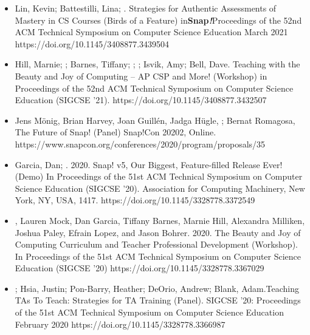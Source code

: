 \begin{itemize}
    \item{Lin, Kevin; Battestilli, Lina; \me. Strategies for Authentic Assessments of Mastery in CS Courses (Birds of a Feature) in\textbf{Snap\textit{!}}Proceedings of the 52nd ACM Technical Symposium on Computer Science Education March 2021
    \newline
    https://doi.org/10.1145/3408877.3439504}
    
    \item{Hill, Marnie; \dan; Barnes, Tiffany; \lauren; \me; Isvik, Amy; Bell, Dave. Teaching with the Beauty and Joy of Computing – AP CSP and More! (Workshop) in Proceedings of the 52nd ACM Technical Symposium on Computer Science Education (SIGCSE '21).
    \newline
    https://doi.org/10.1145/3408877.3432507}
    
    \item{Jens Mönig, Brian Harvey, Joan Guillén, Jadga Hügle, \me; Bernat Romagosa, The Future of Snap! (Panel) Snap!Con 20202, Online.
    \newline
    https://www.snapcon.org/conferences/2020/program/proposals/35
    }
    
    \item{Garcia, Dan; \me. 2020. Snap! v5, Our Biggest, Feature-filled Release Ever! (Demo) In Proceedings of the 51st ACM Technical Symposium on Computer Science Education (SIGCSE '20). Association for Computing Machinery, New York, NY, USA, 1417. https://doi.org/10.1145/3328778.3372549}
    
    \item{\me, Lauren Mock, Dan Garcia, Tiffany Barnes, Marnie Hill, Alexandra Milliken, Joshua Paley, Efrain Lopez, and Jason Bohrer. 2020. The Beauty and Joy of Computing Curriculum and Teacher Professional Development (Workshop). In Proceedings of the 51st ACM Technical Symposium on Computer Science Education (SIGCSE '20)
    \newline
    https://doi.org/10.1145/3328778.3367029}
    
    \item{\me; Hsia, Justin; Pon-Barry, Heather; DeOrio, Andrew; Blank, Adam.Teaching TAs To Teach: Strategies for TA Training (Panel). SIGCSE '20: Proceedings of the 51st ACM Technical Symposium on Computer Science Education February 2020
    \newline
    https://doi.org/10.1145/3328778.3366987}

    

\end{itemize}
